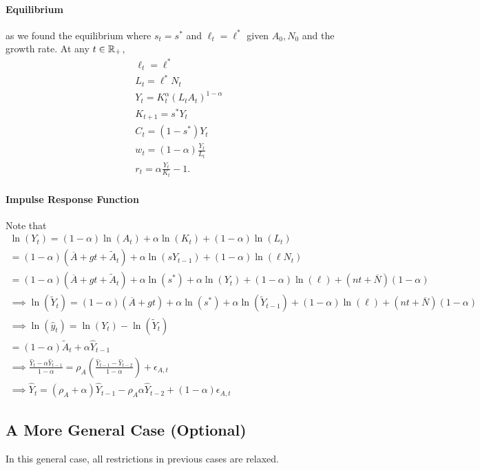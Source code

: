 \documentclass[11pt]{article}
\begin{document}
		\paragraph{Equilibrium} as we found the equilibrium where $s_t = s^*$ and $\ell_t = \ell^*$ given $A_0, N_0$ and the growth rate. At any $t \in \mathbb{R}_+$,
		\begin{gather*}
			\ell_t = \ell^* \\
			L_t = \ell^* N_t \\
			Y_t = K_t^\alpha (L_t A_t) ^{1-\alpha} \\
			K_{t+1} = s^* Y_t \\
			C_t = (1-s^*)Y_t \\
			w_t = (1-\alpha) \frac{Y_t}{L_t} \\
			r_t = \alpha \frac{Y_t}{K_t} - 1.
		\end{gather*}
		
		\paragraph{Impulse Response Function} Note that
		\begin{gather*}
			\ln(Y_t) = (1 - \alpha) \ln(A_t) + \alpha \ln (K_t) + (1-\alpha) \ln (L_t) \\
			= (1 - \alpha) (\overline{A} + gt + \tilde{A}_t) + \alpha \ln(s Y_{t-1}) + (1-\alpha) \ln(\ell N_t) \\
			= (1 - \alpha) (\overline{A} + gt + \tilde{A}_t) + \alpha \ln (s^*) + \alpha \ln(Y_t) + (1-\alpha) \ln (\ell) + (nt + \overline{N})(1-\alpha) \\
			\implies \ln(\tilde{Y}_t) = (1-\alpha) (\overline{A} + gt) + \alpha \ln(s^*) + \alpha \ln(\tilde{Y}_{t-1}) + (1-\alpha) \ln(\ell) + (nt + \overline{N})(1-\alpha) \\
			\implies \ln(\hat{y}_t) = \ln(Y_t) - \ln(\tilde{Y}_t) \\
			= (1-\alpha)\tilde{A}_t + \alpha \hat{Y}_{t-1} \\
			\implies \frac{\hat{Y}_t - \alpha \hat{Y}_{t-1}}{1-\alpha} = \rho_A (\frac{\hat{Y}_{t-1} - \hat{Y}_{t-2}}{1-\alpha}) + \epsilon_{A, t} \\
			\implies \hat{Y}_{t} = (\rho_A + \alpha) \hat{Y}_{t-1} - \rho_A \alpha \hat{Y}_{t-2} + (1 - \alpha)\epsilon_{A, t}
		\end{gather*}
		
		\subsection{A More General Case (Optional)}
			\begin{assumption}
				In this general case, all restrictions in previous cases are relaxed.
			\end{assumption}
			
\end{document}
